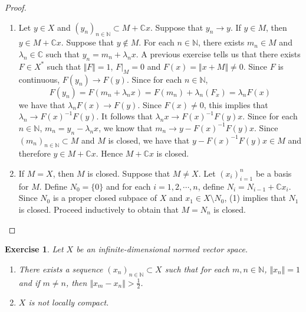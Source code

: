 \documentclass[12pt]{amsart}
\newtheorem{ex}[thm]{Exercise}
\newcommand{\lam}{\lambda}
\newcommand{\C}{\mathbb{C}}
\newcommand{\N}{\mathbb{N}}
\newcommand{\conv}[1]{\xrightarrow{#1}}
\newcommand{\n}{\Vert}
\begin{document}
\begin{proof}
\begin{enumerate}
\item Let $y \in X$ and $(y_n)_{n \in \N} \subset M+ \C x$. Suppose that $y_n \conv{} y$. If $y \in M$, then $y \in M+ \C x$. Suppose that $y \not \in M$. For each $n \in \N$, there exists $m_n \in M$ and $\lam_n \in \C$ such that $y_n = m_n + \lam_nx$. A previous exercise tells us that there exists $F \in X^*$ such that $\n F \n = 1$, $F|_M = 0$ and $F(x) = \n x+M \n \neq 0$. Since $F$ is continuous, $F(y_n) \conv{} F(y)$. Since for each $n \in \N$, $$F(y_n) = F(m_n + \lam_n x) = F(m_n)+ \lam_n (F_x) = \lam_n F(x)$$ we have that $\lam_n F(x) \conv{} F(y)$. Since $F(x) \neq 0$, this implies that $\lam_n \conv{} F(x)^{-1} F(y)$. It follows that $\lam_n x \conv{}F(x)^{-1}F(y)x$. Since  for each $n \in \N$, $m_n = y_n - \lam_nx$, we know that $m_n \conv{} y-F(x)^{-1}F(y)x$. Since $(m_n)_{n \in \N} \subset M$ and $M$ is closed, we have that $y-F(x)^{-1}F(y)x \in M$ and therefore $y \in M+\C x$. Hence $M+\C x$ is closed. \vspace{.5cm}\\
\item If $M = X$, then $M$ is closed. Suppose that $M \neq X$. Let $(x_i)_{i=1}^n$ be a basis for $M$. Define $N_0 = \{0\}$ and for each $i =1,2, \cdots, n$, define $N_i = N_{i-1}+\C x_i$. Since $N_0$ is a proper closed subpace of $X$ and $x_1 \in X \setminus N_0$, (1) implies that $N_1$ is closed. Proceed inductively to obtain that $M = N_n$ is closed.
\end{enumerate}
\end{proof}

\begin{ex}
Let $X$ be an infinite-dimensional normed vector space. 
\begin{enumerate}
\item There exists a sequence $(x_n)_{n\in \N} \subset X$ such that for each $m, n \in \N$, $\n x_n \n = 1$ and if $m \neq n$, then $\n x_m - x_n \n > \frac{1}{2}$.
\item $X$ is not locally compact. 
\end{enumerate}
\end{ex}
\end{document}
